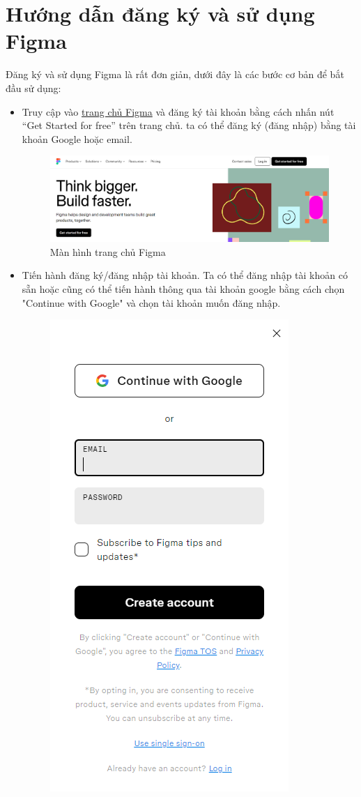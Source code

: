 \documentclass[11pt]{article}
\begin{document}
\section{Hướng dẫn đăng ký và sử dụng Figma}
Đăng ký và sử dụng Figma là rất đơn giản, dưới đây là các bước cơ bản để bắt đầu sử dụng:
\begin{itemize}
    \item Truy cập vào \href{https://www.figma.com/}{trang chủ Figma} và đăng ký tài khoản bằng cách nhấn nút “Get Started for free” trên trang chủ. ta có thể đăng ký (đăng nhập) bằng tài khoản Google hoặc email.
          \begin{figure}[!h]
              \centering
              \includegraphics[width=1\linewidth]{imgs/image.png}
              \caption{Màn hình trang chủ Figma}
          \end{figure}
          \newpage
    \item Tiến hành đăng ký/đăng nhập tài khoản. Ta có thể đăng nhập tài khoản có sẵn hoặc cũng có thể tiến hành thông qua tài khoản google bằng cách chọn "Continue with Google" và chọn tài khoản muốn đăng nhập.
          \begin{figure}[!h]
              \centering
              \includegraphics[width=0.5\linewidth]{imgs/image copy.png}

\end{figure}
\end{itemize}
\end{document}
